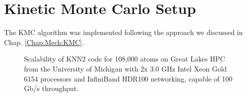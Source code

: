 \newpage
\section{Kinetic Monte Carlo Setup}
\label{Chap:Al/Vac:section:KMC}

The \ac{KMC} algorithm was implemented following the approach we discussed in Chap. \ref{Chap:Mech:KMC}. 


\newpage
\begingroup
\begin{figure}[!ht]
  \centering
\caption[Scalability of KNN2 code on Great Lakes HPC.]{Scalability of KNN2 code for 108,000 atoms on Great Lakes HPC from the University of Michigan with 2x 3.0 GHz Intel Xeon Gold 6154 processors and InfiniBand HDR100 networking, capable of 100 Gb/s throughput.}
\label{Chap:Al/Vac:fig:scale}
\end{figure}
\endgroup
